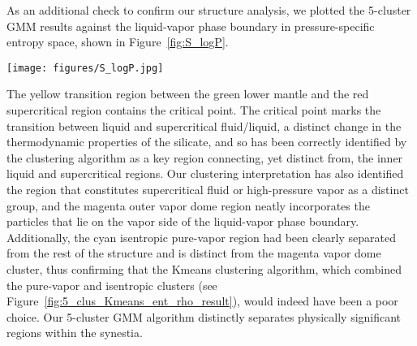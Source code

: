 \documentclass[fleqn,usenatbib,useAMS]{mnras}
\begin{document}
As an additional check to confirm our structure analysis, we plotted the 5-cluster GMM results against the liquid-vapor phase boundary in pressure-specific entropy space, shown in Figure~\ref{fig:S_logP}.
%
\begin{figure*}
\centering
\texttt{[image: figures/S\_logP.jpg]}
\caption{Our 5-cluster GMM results plotted in a specific entropy-pressure phase space, where cluster membership is the same as in Figure~\ref{fig:5_clus_GMM_result}. In this phase-space, the liquid-vapor phase boundary is a dome-shaped
curve (black line). The black dot on the vapor dome is the critical point for the equation of state used in these
simulations ($S_{crit}$ = 5.40e7 erg K$^{-1}$ g$^{-1}$, $p_{crit}$ = 2.55 GPa, $T_{crit}$ = 8,810 K, $\rho_{crit}$ = 1.68 g cm$^{-3}$). Material to the left of the dome is liquid, material to the right of the dome and below the critical point is vapor, material above and to the right of the critical point is supercritical fluid (SCF), and material within the dome is a mixture of both liquid and vapor.}
\label{fig:S_logP}
\end{figure*}
%
The yellow transition region between the green lower mantle and the red supercritical region contains the critical point. The critical point marks the transition between liquid and supercritical fluid/liquid, a distinct change in the thermodynamic properties of the silicate, and so has been correctly identified by the clustering algorithm as a key region connecting, yet distinct from, the inner liquid and supercritical regions. Our clustering interpretation has also identified the region that constitutes supercritical fluid or high-pressure vapor as a distinct group, and the magenta outer vapor dome region neatly incorporates the particles that lie on the vapor side of the liquid-vapor phase boundary. Additionally, the cyan isentropic pure-vapor region had been clearly separated from the rest of the structure and is distinct from the magenta vapor dome cluster, thus confirming that the Kmeans clustering algorithm, which combined the pure-vapor and isentropic clusters (see Figure~\ref{fig:5_clus_Kmeans_ent_rho_result}), would indeed have been a poor choice. Our 5-cluster GMM algorithm distinctly separates physically significant regions within the synestia. \par
\end{document}
